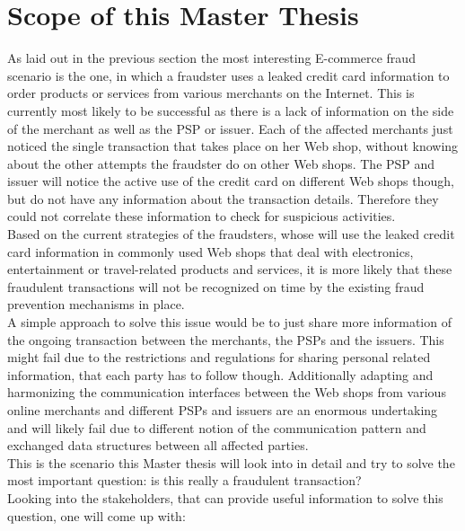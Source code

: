 
\section{Scope of this Master Thesis}
\label{sec:scope_thesis}

As laid out in the previous section the most interesting E-commerce fraud scenario is the one, in which a fraudster uses a leaked credit card information to order products or services from various merchants on the Internet. This is currently most likely to be successful as there is a lack of information on the side of the merchant as well as the \gls{PSP} or issuer. Each of the affected merchants just noticed the single transaction that takes place on her Web shop, without knowing about the other attempts the fraudster do on other Web shops. The \gls{PSP} and issuer will notice the active use of the credit card on different Web shops though, but do not have any information about the transaction details. Therefore they could not correlate these information to check for suspicious activities. \\

Based on the current strategies of the fraudsters, whose will use the leaked credit card information in commonly used Web shops that deal with electronics, entertainment or travel-related products and services, it is more likely that these fraudulent transactions will not be recognized on time by the existing fraud prevention mechanisms in place. \\

A simple approach to solve this issue would be to just share more information of the ongoing transaction between the merchants, the \gls{PSP}s and the issuers. This might fail due to the restrictions and regulations for sharing personal related information, that each party has to follow though. Additionally adapting and harmonizing the communication interfaces between the Web shops from various online merchants and different \gls{PSP}s and issuers are an enormous undertaking and will likely fail due to different notion of the communication pattern and exchanged data structures between all affected parties. \\

This is the scenario this Master thesis will look into in detail and try to solve the most important question: is this really a fraudulent transaction? \\

Looking into the stakeholders, that can provide useful information to solve this question, one will come up with:\@


